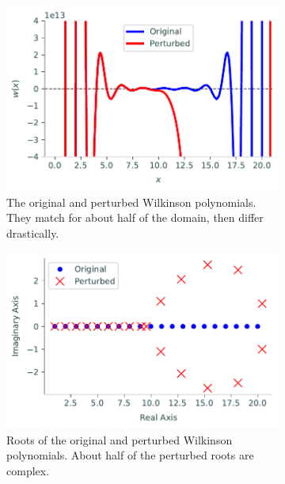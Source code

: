 \begin{figure}[H] %
\captionsetup[subfigure]{justification=justified}
\centering
\begin{subfigure}{.48\textwidth}
    \centering
    \includegraphics[width=\linewidth]{figures/perturbed_poly.pdf}
    \caption{The original and perturbed Wilkinson polynomials.
    They match for about half of the domain, then differ drastically.}
    \label{fig:wilkinson-perturbed-poly}
\end{subfigure}
\quad
\begin{subfigure}{.48\textwidth}
    \centering
    \includegraphics[width=\linewidth]{figures/perturbed_roots.pdf}
    \caption{Roots of the original and perturbed Wilkinson polynomials.
    About half of the perturbed roots are complex.}
    \label{fig:wilkinon-perturbed-roots}
\end{subfigure}
\caption{}
\label{fig:wilkinson-polynomial}
\end{figure}

